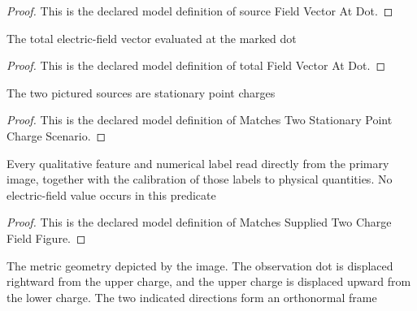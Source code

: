 \begin{proof}
  This is the declared model definition of source Field Vector At Dot.
\end{proof}
\begin{definition}
  \label{def:physics:phyx-mini-0914:phyxminiproblems-problemphyxmini0914-totalfieldvectoratdot}
  The total electric-field vector evaluated at the marked dot
\end{definition}
\begin{proof}
  This is the declared model definition of total Field Vector At Dot.
\end{proof}
\begin{definition}
  \label{def:physics:phyx-mini-0914:phyxminiproblems-problemphyxmini0914-matchestwostationarypointchargescenario}
  The two pictured sources are stationary point charges
\end{definition}
\begin{proof}
  This is the declared model definition of Matches Two Stationary Point Charge Scenario.
\end{proof}
\begin{definition}
  \label{def:physics:phyx-mini-0914:phyxminiproblems-problemphyxmini0914-matchessuppliedtwochargefieldfigure}
  Every qualitative feature and numerical label read directly from the primary image, together with the calibration of those labels to physical quantities. No electric-field value occurs in this predicate
\end{definition}
\begin{proof}
  This is the declared model definition of Matches Supplied Two Charge Field Figure.
\end{proof}
\begin{definition}
  \label{def:physics:phyx-mini-0914:phyxminiproblems-problemphyxmini0914-satisfiestwochargefiguregeometry}
  The metric geometry depicted by the image. The observation dot is displaced rightward from the upper charge, and the upper charge is displaced upward from the lower charge. The two indicated directions form an orthonormal frame
\end{definition}
